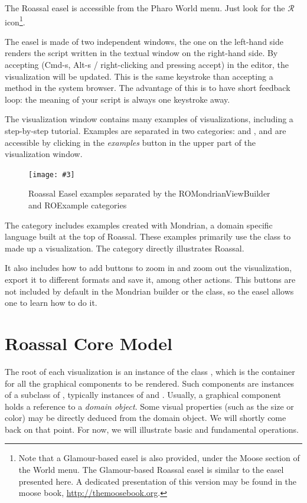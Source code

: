 \documentclass[a4paper,10pt,twoside]{book}
\newcommand{\fig}[4]{
		\begin{figure}[#1]
			\centering
			\texttt{[image: \#3]}
			\caption{\label{fig:#3}#4}
		\end{figure}}
\begin{document}
The Roassal easel is accessible from the Pharo World menu. Just look for the {\color{red} $\mathcal{R}$} icon\footnote{Note that a Glamour-based easel is also provided, under the Moose section of the World menu. The Glamour-based Roassal easel is similar to the easel presented here. A dedicated presentation of this version may be found in the moose book, \url{http://themoosebook.org}.}.

The easel is made of two independent windows, the one on the left-hand side renders the script written in the textual window on the right-hand side. By accepting (Cmd-s, Alt-s / right-clicking and pressing accept) in the editor, the visualization will be updated. This is the same keystroke than accepting a method in the system browser. The advantage of this is to have short feedback loop: the meaning of your script is always one keystroke away.

The visualization window contains many examples of visualizations, including a step-by-step tutorial. Examples are separated in two categories:  and , and are accessible by clicking in the \textit{examples} button in the upper part of the visualization window.

\fig{H}{1}{ROEasel}{Roassal Easel examples separated by the ROMondrianViewBuilder and ROExample categories}


The  category includes examples created with Mondrian, a domain specific language built at the top of Roassal. These examples primarily use the  class to made up a visualization. The   category directly illustrates Roassal.

It also includes how to add buttons to zoom in and zoom out the visualization, export it to different formats and save it, among other actions. This buttons are not included by default in the Mondrian builder or the  class, so the easel allows one to learn how to do it.


\section{Roassal Core Model}

The root of each visualization is an instance of the class , which is the container for all the graphical components to be rendered.
Such components are instances of a subclass of , typically instances of  and . Usually, a graphical component holds a reference to a \emph{domain object}. Some visual properties (such as the size or color) may be directly deduced from the domain object. We will shortly come back on that point. For now, we will illustrate basic and fundamental operations.
\end{document}

